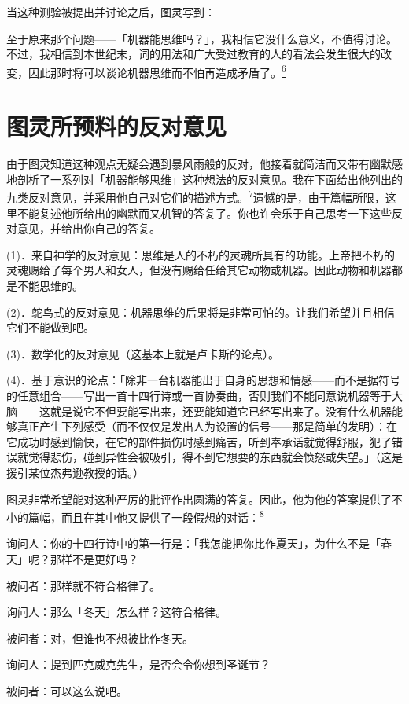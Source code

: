 \documentclass[
  12pt,
  twoside,
  openright,
  oldfontcommands,
]{memoir}
\begin{document}
当这种测验被提出并讨论之后，图灵写到：

至于原来那个问题------「机器能思维吗？」，我相信它没什么意义，不值得讨论。不过，我相信到本世纪末，词的用法和广大受过教育的人的看法会发生很大的改变，因此那时将可以谈论机器思维而不怕再造成矛盾了。\hyperref[fn:Chapter18-6]{\textsuperscript{6}}

\section{图灵所预料的反对意见}

由于图灵知道这种观点无疑会遇到暴风雨般的反对，他接着就简洁而又带有幽默感地剖析了一系列对「机器能够思维」这种想法的反对意见。我在下面给出他列出的九类反对意见，并采用他自己对它们的描述方式。\hyperref[fn:Chapter18-7]{\textsuperscript{7}}遗憾的是，由于篇幅所限，这里不能复述他所给出的幽默而又机智的答复了。你也许会乐于自己思考一下这些反对意见，并给出你自己的答复。

(1)．来自神学的反对意见：思维是人的不朽的灵魂所具有的功能。上帝把不朽的灵魂赐给了每个男人和女人，但没有赐给任给其它动物或机器。因此动物和机器都是不能思维的。

(2)．鸵鸟式的反对意见：机器思维的后果将是非常可怕的。让我们希望并且相信它们不能做到吧。

(3)．数学化的反对意见（这基本上就是卢卡斯的论点）。

(4)．基于意识的论点：「除非一台机器能出于自身的思想和情感------而不是据符号的任意组合------写出一首十四行诗或一首协奏曲，否则我们不能同意说机器等于大脑------这就是说它不但要能写出来，还要能知道它已经写出来了。没有什么机器能够真正产生下列感受（而不仅仅是发出人为设置的信号------那是简单的发明）：在它成功时感到愉快，在它的部件损伤时感到痛苦，听到奉承话就觉得舒服，犯了错误就觉得悲伤，碰到异性会被吸引，得不到它想要的东西就会愤怒或失望。」（这是援引某位杰弗逊教授的话。）

图灵非常希望能对这种严厉的批评作出圆满的答复。因此，他为他的答案提供了不小的篇幅，而且在其中他又提供了一段假想的对话：\hyperref[fn:Chapter18-8]{\textsuperscript{8}}

询问人：你的十四行诗中的第一行是：「我怎能把你比作夏天」，为什么不是「春天」呢？那样不是更好吗？

被问者：那样就不符合格律了。

询问人：那么「冬天」怎么样？这符合格律。

被问者：对，但谁也不想被比作冬天。

询问人：提到匹克威克先生，是否会令你想到圣诞节？

被问者：可以这么说吧。
\end{document}
